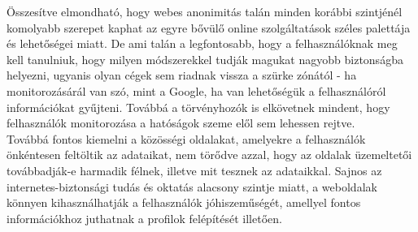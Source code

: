 
Összesítve elmondható, hogy webes anonimitás talán minden korábbi szintjénél komolyabb szerepet kaphat az egyre bővülő online szolgáltatások széles palettája és lehetőségei miatt. De ami talán a legfontosabb, hogy a felhasználóknak meg kell tanulniuk, hogy milyen módszerekkel tudják magukat nagyobb biztonságba helyezni, ugyanis olyan cégek sem riadnak vissza a szürke zónától - ha monitorozásárál van szó, mint a Google, ha van lehetőségük a felhasználóról információkat gyűjteni. Továbbá a törvényhozók is elkövetnek mindent, hogy felhasználók monitorozása a hatóságok szeme elől sem lehessen rejtve.\hfill\\
Továbbá fontos kiemelni a közösségi oldalakat, amelyekre a felhasználók önkéntesen feltöltik az adataikat, nem törődve azzal, hogy az oldalak üzemeltetői továbbadják-e harmadik félnek, illetve mit tesznek az adataikkal. Sajnos az internetes-biztonsági tudás és oktatás alacsony szintje miatt, a weboldalak könnyen kihasználhatják a felhasználók jóhiszeműségét, amellyel fontos információkhoz juthatnak a profilok felépítését illetően.
